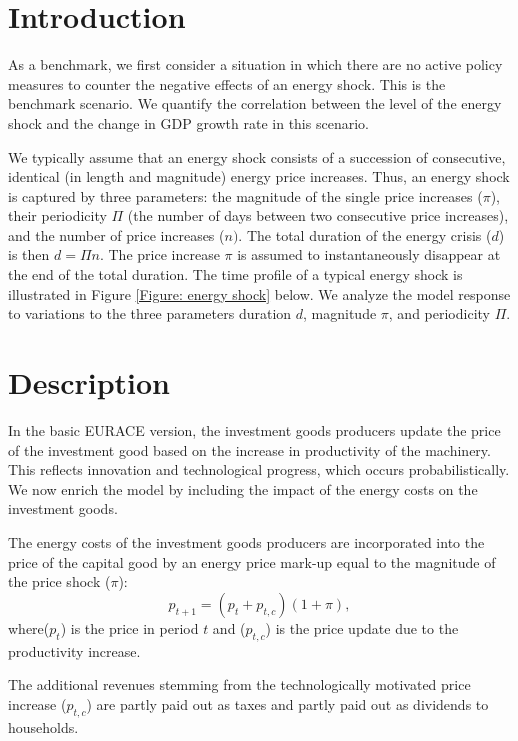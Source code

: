 
\section{Introduction}

As a benchmark, we first consider a situation in which there are no active
policy measures to counter the negative effects of an energy shock. This is the
benchmark scenario. We quantify the correlation between the level of the
energy shock and the change in GDP growth rate in this scenario.

We typically assume that an energy shock consists of a succession of
consecutive, identical (in length and magnitude) energy price increases.
Thus, an energy shock is captured by three parameters: the magnitude of the
single price increases ($\pi$), their periodicity $\Pi$ (the number of
days between two consecutive price increases), and the number of price
increases ($n).$ The total duration of the energy crisis ($d$) is then $%
d=\Pi n$. The price increase $\pi$ is assumed to instantaneously disappear at the end
of the total duration. The time profile of a typical energy shock is illustrated in Figure
\ref{Figure: energy shock} below.
We analyze the model response to variations to the three parameters duration
$d$, magnitude $\pi$, and periodicity $\Pi$.

\section{Description}

In the basic EURACE version, the investment goods producers update the price
of the investment good based on the increase in productivity of the
machinery. This reflects innovation and technological progress, which occurs
probabilistically. We now enrich the model by including the impact of the
energy costs on the investment goods.

The energy costs of the investment goods producers are incorporated into the
price of the capital good by an energy price mark-up equal to the magnitude
of the price shock ($\pi $):
\begin{equation}
p_{t+1}=(p_{t}+p_{t,c})(1+\pi ),
\end{equation}%
where($p_{t}$) is the price in period $t$ and ($p_{t,c}$) is the price
update due to the productivity increase.

The additional revenues stemming from the technologically motivated price
increase ($p_{t,c}$) are partly paid out as taxes and partly paid out as
dividends to households.

